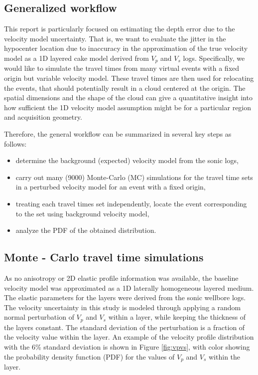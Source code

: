 \subsection{Generalized workflow}
This report is particularly focused on estimating the depth error due to the velocity model uncertainty. That is, we want to evaluate the jitter in the hypocenter location due to inaccuracy in the approximation of the true velocity model as a 1D layered cake model derived from $V_{p}$ and $V_{s}$ logs. Specifically, we would like to simulate the travel times from many virtual events with a fixed origin but variable velocity model. These travel times are then used for relocating the events, that should potentially result in a cloud centered at the origin. The spatial dimensions and the shape of the cloud can give a quantitative insight into how sufficient the 1D velocity model assumption might be for a particular region and acquisition geometry.

Therefore, the general workflow can be summarized in several key steps as follows:
\begin{itemize}
 \item determine the background (expected) velocity model from the sonic logs,
 \item carry out many (9000) Monte-Carlo (MC) simulations for the travel time sets in a perturbed velocity model for an event with a fixed origin,
 \item treating each travel times set independently, locate the event corresponding to the set using background velocity model,
 \item analyze the PDF of the obtained distribution.
\end{itemize}



\subsection{Monte - Carlo travel time simulations}
 As no anisotropy or 2D elastic profile information was available, the baseline velocity model was approximated as a 1D laterally homogeneous layered medium. The elastic parameters for the layers were derived from the sonic wellbore logs. The velocity uncertainty in this study is modeled through applying a random normal perturbation of $V_{p}$ and $V_{s}$ within a layer, while keeping the thickness of the layers constant. The standard deviation of the perturbation is a fraction of the velocity value within the layer. An example of the velocity profile distribution with the 6\% standard deviation is shown in Figure \ref{fig:vpvs}, with color showing the probability density function (PDF) for the values of $V_{p}$ and $V_{s}$ within the layer.

